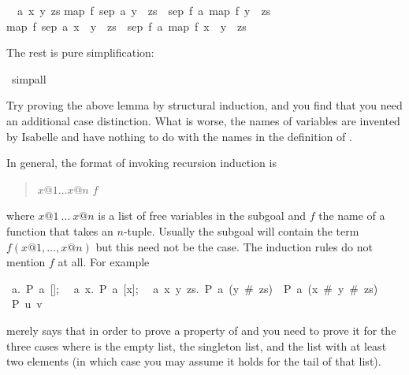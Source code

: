 \begin{isabellebody}
\begin{isamarkuptxt}
\begin{isabelle}
\ {}{\isachardot}\ {\isasymAnd}a\ x\ y\ zs{\isachardot}\isanewline
{}map\ f\ {\isacharparenleft}sep\ {\isacharparenleft}a{\isacharcomma}\ y\ {\isacharhash}\ zs{\isacharparenright}{\isacharparenright}\ {\isacharequal}\ sep\ {\isacharparenleft}f\ a{\isacharcomma}\ map\ f\ {\isacharparenleft}y\ {\isacharhash}\ zs{\isacharparenright}{\isacharparenright}\ {\isasymLongrightarrow}\isanewline
{}map\ f\ {\isacharparenleft}sep\ {\isacharparenleft}a{\isacharcomma}\ x\ {\isacharhash}\ y\ {\isacharhash}\ zs{\isacharparenright}{\isacharparenright}\ {\isacharequal}\ sep\ {\isacharparenleft}f\ a{\isacharcomma}\ map\ f\ {\isacharparenleft}x\ {\isacharhash}\ y\ {\isacharhash}\ zs{\isacharparenright}{\isacharparenright}%
\end{isabelle}
The rest is pure simplification:%
\end{isamarkuptxt}%
\ simp{\isacharunderscore}all\isanewline
{}%
\begin{isamarkuptext}%
Try proving the above lemma by structural induction, and you find that you
need an additional case distinction. What is worse, the names of variables
are invented by Isabelle and have nothing to do with the names in the
definition of .

In general, the format of invoking recursion induction is
\begin{quote}
$x@1 \dots x@n$  $f$
\end{quote}%
where $x@1~\dots~x@n$ is a list of free variables in the subgoal and $f$ the
name of a function that takes an $n$-tuple. Usually the subgoal will
contain the term $f(x@1,\dots,x@n)$ but this need not be the case. The
induction rules do not mention $f$ at all. For example 
\begin{isabelle}
{\isasymlbrakk}~{\isasymAnd}a.~P~a~[];\isanewline
~~{\isasymAnd}a~x.~P~a~[x];\isanewline
~~{\isasymAnd}a~x~y~zs.~P~a~(y~\#~zs)~{\isasymLongrightarrow}~P~a~(x~\#~y~\#~zs){\isasymrbrakk}\isanewline
{\isasymLongrightarrow}~P~u~v%
\end{isabelle}
merely says that in order to prove a property  of  and
 you need to prove it for the three cases where  is the
empty list, the singleton list, and the list with at least two elements
(in which case you may assume it holds for the tail of that list).%
\end{isamarkuptext}%
\end{isabellebody}%
